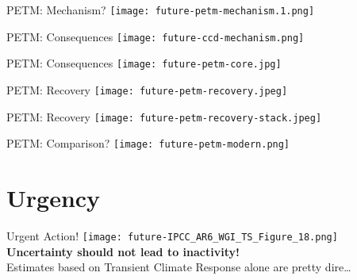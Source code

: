 \documentclass[aspectratio=169]{beamer}
\begin{document}
\begin{frame}{PETM: Mechanism?}
    \centering
    \texttt{[image: future-petm-mechanism.1.png]}
\end{frame}

\begin{frame}{PETM: Consequences}
    \centering
    \texttt{[image: future-ccd-mechanism.png]}
\end{frame}

\begin{frame}{PETM: Consequences}
    \centering
    \texttt{[image: future-petm-core.jpg]}
\end{frame}

\begin{frame}{PETM: Recovery}
    \centering
    \texttt{[image: future-petm-recovery.jpeg]}
\end{frame}

\begin{frame}{PETM: Recovery}
    \centering
    \texttt{[image: future-petm-recovery-stack.jpeg]}
\end{frame}

\begin{frame}{PETM: Comparison?}
    \centering
    \texttt{[image: future-petm-modern.png]}
\end{frame}

\section{Urgency}

\begin{frame}{Urgent Action!}
    \centering
    \texttt{[image: future-IPCC\_AR6\_WGI\_TS\_Figure\_18.png]}
    \textbf{Uncertainty should not lead to inactivity!}\\Estimates based on Transient Climate Response alone are pretty dire\dots
\end{frame}
\end{document}
